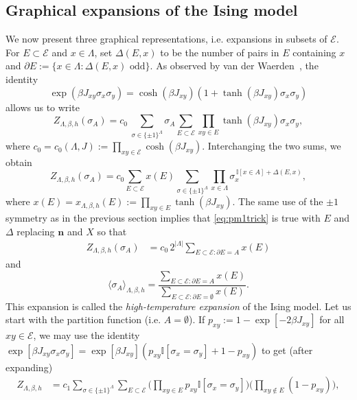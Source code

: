 \documentclass[a4paper,oneside,11pt]{article}
\newcommand{\ee}{\end{equation}}
\newcommand{\be}{\begin{equation}}
\begin{document}
\subsection{Graphical expansions of the Ising model} We now present three graphical representations, i.e. expansions in subsets of $\mathcal E$.
\medbreak
{} For $E\subset \mathcal E$ and $x\in \Lambda$, set $\Delta(E,x)$ to be the number of pairs in $E$ containing $x$ and 
$\partial E:=\{x\in \Lambda:\Delta(E,x)\text{ odd}\}.
$
As observed by van der Waerden~\cite{vdW}, the identity
$$
\exp(\beta J_{xy}\sigma_x\sigma_y)=\cosh(\beta J_{xy})(1+\tanh(\beta J_{xy})\sigma_x\sigma_y)
$$
allows us to write 
\be
Z_{\Lambda,\beta,h}(\sigma_A)=c_0\ \sum_{\sigma\in\{\pm1\}^\Lambda}\sigma_A\sum_{E\subset \mathcal E}\prod_{xy\in E}\tanh(\beta J_{xy})\sigma_x\sigma_y,\ee
where 
$c_0=c_0(\Lambda,J):=\prod_{xy\in\mathcal E}\cosh(\beta J_{xy}).
$
Interchanging the two sums, we obtain
\be\nonumber
Z_{\Lambda,\beta,h}(\sigma_A)=c_0\sum_{E\subset \mathcal E}x(E)\sum_{\sigma\in\{\pm1\}^\Lambda}\prod_{x\in \Lambda}\sigma_x^{\,\mathbb{I}[x\in A]+\Delta(E,x)},
\ee
where
$x(E)=x_{\Lambda,\beta,h}(E):=\prod_{xy\in E}\tanh(\beta J_{xy}).$
The same use of the $\pm 1$ symmetry as in the previous section implies that \eqref{eq:pm1trick} is true with $E$ and $\Delta$ replacing $\mathbf n$ and $X$  so that 
\begin{align}\label{eq:high temperature expansion}
Z_{\Lambda,\beta,h}(\sigma_A)&=c_0\,2^{|\Lambda|}\sum_{E\subset\mathcal E:\partial E=A}x(E)
\end{align}
and
\be\label{eq:78}
\langle\sigma_A\rangle_{\Lambda,\beta,h}=\frac{\sum_{E\subset\mathcal E:\partial E=A}x(E)}{\sum_{E\subset\mathcal E:\partial E=\emptyset}x(E)}.\ee
This expansion is called the {\em high-temperature expansion} of the Ising model. \bigbreak
{} Let us start with the partition function (i.e. $A=\emptyset$). If $p_{xy}:=1-\exp[-2\beta J_{xy}]$ for all $xy\in\mathcal E$, we may use the identity 
$\exp[\beta J_{xy}\sigma_x\sigma_y]=\exp[\beta J_{xy}](p_{xy}\mathbb I[\sigma_x=\sigma_y]+1-p_{xy})$
to get (after expanding)
\begin{align*}
Z_{\Lambda,\beta,h}%
&=c_1\sum_{\sigma\in\{\pm 1\}^{\Lambda}}\sum_{E\subset \mathcal E}\Big(\prod_{xy\in E}p_{xy}\mathbb I[\sigma_x=\sigma_y]\Big)\Big(\prod_{xy\notin E}(1-p_{xy})\Big),\end{align*}
\end{document}
